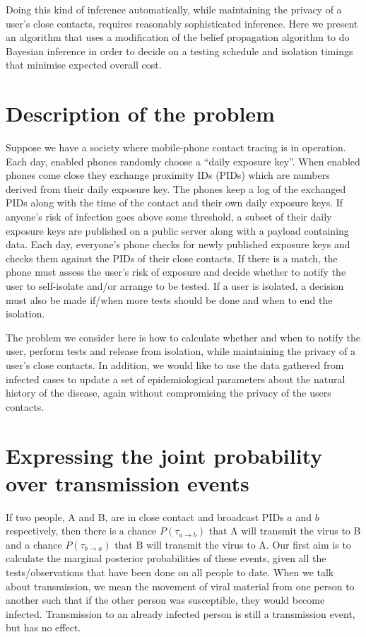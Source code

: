 \documentclass{article}
\begin{document}
Doing this kind of inference automatically, while maintaining the privacy of a user's close contacts, requires reasonably sophisticated inference. Here we present an algorithm that uses a modification of the belief propagation algorithm\cite{pearl2014probabilistic} to do Bayesian inference in order to decide on a testing schedule and isolation timings that minimise expected overall cost.

\section{Description of the problem}

Suppose we have a society where mobile-phone contact tracing is in operation. Each day, enabled phones randomly choose a ``daily exposure key''. When enabled phones come close they exchange proximity IDs (PIDs) which are numbers derived from their daily exposure key. The phones keep a log of the exchanged PIDs along with the time of the contact and their own daily exposure keys. If anyone's risk of infection goes above some threshold, a subset of their daily exposure keys are published on a public server along with a payload containing data. Each day, everyone's phone checks for newly published exposure keys and checks them against the PIDs of their close contacts. If there is a match, the phone must assess the user's risk of exposure and decide whether to notify the user to self-isolate and/or arrange to be tested. If a user is isolated, a decision must also be made if/when more tests should be done and when to end the isolation.

The problem we consider here is how to calculate whether and when to notify the user, perform tests and release from isolation, while maintaining the privacy of a user's close contacts. In addition, we would like to use the data gathered from infected cases to update a set of epidemiological parameters about the natural history of the disease, again without compromising the privacy of the users contacts.


\section{Expressing the joint probability over transmission events}

If two people, A and B, are in close contact and broadcast PIDs $a$ and $b$ respectively, then there is a chance $P(\tau_{a \rightarrow b})$ that A will transmit the virus to B and a chance $P(\tau_{b \rightarrow a})$ that B will transmit the virus to A. Our first aim is to calculate the marginal posterior probabilities of these events, given all the tests/observations that have been done on all people to date. When we talk about transmission, we mean the movement of viral material from one person to another such that if the other person was susceptible, they would become infected. Transmission to an already infected person is still a transmission event, but has no effect.
\end{document}
